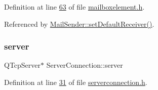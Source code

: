 Definition at line \hyperlink{a00005_source_l00063}{63} of file \hyperlink{a00005_source}{mailboxelement.\+h}.



Referenced by \hyperlink{a00005_source_l00058}{Mail\+Sender\+::set\+Default\+Receiver()}.

\mbox{\label{a00238_aee9a8e6c0f1d25fc2fcb4662631c0c74}} 
\subsubsection{\texorpdfstring{server}{server}}
{\footnotesize\ttfamily Q\+Tcp\+Server$\ast$ Server\+Connection\+::server\hspace{0.3cm}{\ttfamily [protected]}}



Definition at line \hyperlink{a00131_source_l00031}{31} of file \hyperlink{a00131_source}{serverconnection.\+h}.

